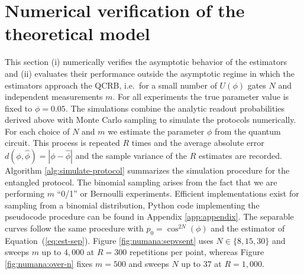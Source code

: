 \section{Numerical verification of the theoretical model}
\label{sec:theory:numerical-results}
This section (i) numerically verifies the asymptotic behavior of the
estimators and (ii) evaluates their performance outside the asymptotic regime in which the estimators approach the QCRB, 
i.e.\ for a small number of $U(\phi)$ gates $N$ and 
independent measurements $m$. For all experiments the true parameter value is fixed to $\phi=0.05$. 
The simulations combine the analytic readout probabilities derived above with 
Monte Carlo sampling to simulate the protocols numerically.
For each choice of $N$ and $m$ we estimate the parameter $\phi$ from the quantum
circuit. This process is repeated $R$ times and the average absolute error 
$d(\phi, \hat\phi) = | \phi - \hat\phi|$ and the sample variance of the $R$ 
estimates are recorded.
Algorithm \ref{alg:simulate-protocol} summarizes the simulation procedure for the entangled protocol.
The binomial sampling arises from the fact that we are performing $m$ ``0/1'' or Bernoulli experiments.
Efficient implementations exist for sampling from a binomial distribution, Python code implementing the pseudocode procedure
can be found in Appendix \ref{app:appendix}.
The separable curves follow the same procedure with $p_0=\cos^{2N}(\phi)$ and the estimator of
Equation~(\ref{eq:est-sep}).
Figure \ref{fig:numana:sepvsent} uses $N\in\{8,15,30\}$ and sweeps $m$ up to $4{,}000$ at $R=300$
repetitions per point, whereas Figure \ref{fig:numana:over-n} fixes $m=500$ and sweeps $N$ up to
$37$ at $R=1{,}000$. 


